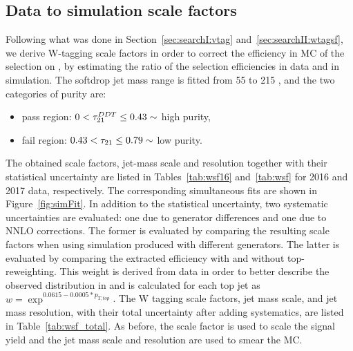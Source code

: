 \clearpage
\subsection{Data to simulation scale factors}
\label{sec:searchIII:wtagSF}
Following what was done in Section~\ref{sec:searchI:vtag} and~\ref{sec:searchII:wtagsf}, we derive W-tagging scale factors in order to correct the efficiency in MC of the selection on \ddt, by estimating the ratio of the selection efficiencies in data and in simulation. The softdrop jet mass range is fitted from 55 to 215 \GeV, and the two categories of purity are:
\begin{itemize}
\itemsep0em
  \item pass region: $0 <  \tau_{21}^{DDT} \leq 0.43 \sim$ high purity,
  \item fail region: $0.43 < \tau_{21} \leq 0.79 \sim$ low purity.
\end{itemize}
The obtained scale factors, jet-mass scale and resolution together with their statistical uncertainty are listed in Tables~\ref{tab:wsf16} and~\ref{tab:wsf} for 2016 and 2017 data, respectively. The corresponding simultaneous fits are shown in Figure~\ref{fig:simFit}. In addition to the statistical uncertainty, two systematic uncertainties are evaluated: one due to generator differences and one due to NNLO corrections. The former is evaluated by comparing the resulting scale factors when using \ttbar simulation produced with different generators. The latter is evaluated by comparing the extracted efficiency with and without top-\PT reweighting. This weight is derived from data in order to better describe the observed \PT distribution in \ttbar and is calculated for each top jet as $w=\exp^{0.0615-0.0005*p_{T,top}}$. The W tagging scale factors, jet mass scale, and jet mass resolution, with their total uncertainty after adding systematics, are listed in Table~\ref{tab:wsf_total}. As before, the scale factor is used to scale the signal yield and the jet mass scale and resolution are used to smear the MC.
